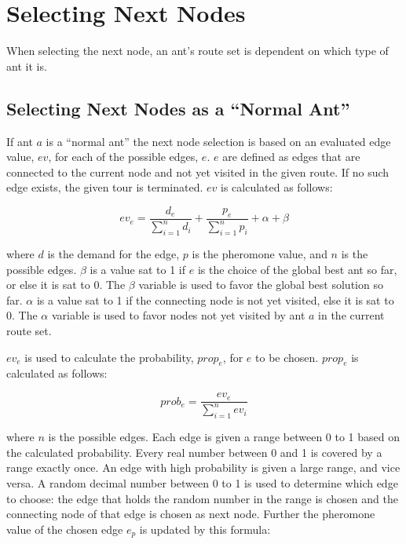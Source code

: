 \section{Selecting Next Nodes}
\label{sec:selectingNextNode}

When selecting the next node, an ant's route set is dependent on which type of ant it is. 

\subsection{Selecting Next Nodes as a ``Normal Ant''}
If ant $a$ is a ``normal ant'' the next node selection is based on an evaluated edge value, $ev$, for each of the possible edges, $e$. $e$ are defined as edges that are connected to the current node and not yet visited in the given route. If no such edge exists, the given tour is terminated. %
$ev$ is calculated as follows: 

$$ev_e = \frac{d_e}{\sum\limits^{n}_{i=1}d_i} + \frac{p_e}{\sum\limits^{n}_{i=1}p_i} + \alpha + \beta$$

where $d$ is the demand for the edge, $p$ is the pheromone value, and $n$ is the possible edges. $\beta$ is a value sat to 1 if $e$ is the choice of the global best ant so far, or else it is sat to 0. The $\beta$ variable is used to favor the global best solution so far. %
$\alpha$ is a value sat to 1 if the connecting node is not yet visited, else it is sat to 0. The $\alpha$ variable is used to favor nodes not yet visited by ant $a$ in the current route set.  

$ev_e$ is used to calculate the probability, $prop_e$, for $e$ to be chosen. $prop_e$ is calculated as follows:

$$prob_e = \frac{ev_e}{\sum\limits^{n}_{i=1}ev_i}$$

where $n$ is the possible edges. Each edge is given a range between 0 to 1 based on the calculated probability. Every real number between 0 and 1 is covered by a range exactly once. An edge with high probability is given a large range, and vice versa. A random decimal number between 0 to 1 is used to determine which edge to choose: the edge that holds the random number in the range is chosen and the connecting node of that edge is chosen as next node. Further the pheromone value of the chosen edge $e_p$ is updated by this formula:

